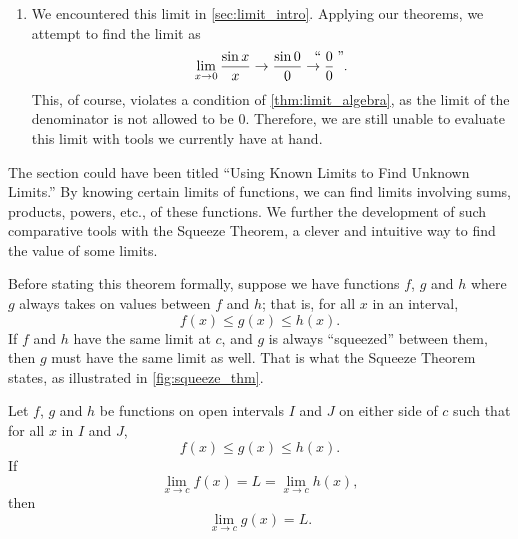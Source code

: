\begin{example}
\begin{enumerate}
	\item	We encountered this limit in \autoref{sec:limit_intro}. Applying our theorems, we attempt to find the limit as
	\[\lim_{x\to 0}\frac{\sin x}{x}\to\frac{\sin 0}{0} \to\zerooverzero.\]
	This, of course, violates a condition of \autoref{thm:limit_algebra}, as the limit of the denominator is not allowed to be 0. Therefore, we are still unable to evaluate this limit with tools we currently have at hand.
\end{enumerate}
\end{example}

The section could have been titled ``Using Known Limits to Find Unknown Limits.'' By knowing certain limits of functions, we can find limits involving sums, products, powers, etc., of these functions. We further the development of such comparative tools with the Squeeze Theorem, a clever and intuitive way to find the value of some limits.

Before stating this theorem formally, suppose we have functions $f$, $g$ and $h$ where $g$ always takes on values between $f$ and $h$; that is, for all $x$ in an interval,
\[f(x) \leq g(x) \leq h(x).\]
If $f$ and $h$ have the same limit at $c$, and $g$  is always ``squeezed'' between them, then $g$ must have the same limit as well. That is what the Squeeze Theorem states, as illustrated in \autoref{fig:squeeze_thm}.


\begin{theorem}\label{thm:sqz}%
Let $f$, $g$ and $h$ be functions on open intervals $I$ and $J$ on either side of $c$ such that for all $x$ in $I$ and $J$,\vspace{-.3\baselineskip}
\[f(x)\leq g(x) \leq h(x).\]
If\vspace{-.4\baselineskip}
\[\lim_{x\to c} f(x) = L = \lim_{x\to c} h(x),\]
then\vspace{-.4\baselineskip}
\[\lim_{x\to c} g(x) = L.\]
\end{theorem}

